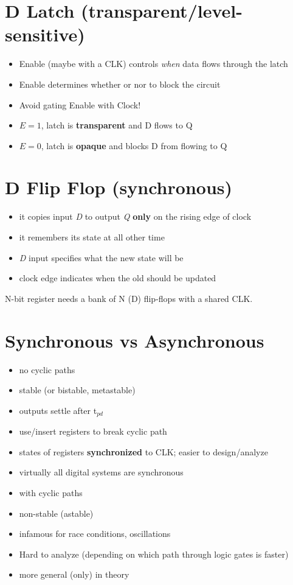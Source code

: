 \documentclass[8pt,a4paper,landscape]{extarticle}
\begin{document}
\begin{multicols*}{3}
\section*{D Latch (transparent/level-sensitive)}
\begin{itemize}
\item Enable (maybe with a CLK) controls \emph{when} data flows through the latch
\item Enable determines whether or nor to block the circuit
\item Avoid gating Enable with Clock!
\item $E = 1$, latch is \textbf{transparent} and D flows to Q
\item $E = 0$, latch is \textbf{opaque} and blocks D from flowing to Q
\end{itemize}
\section*{D Flip Flop (synchronous)}
\begin{itemize}
\item it copies input \emph{D} to output \emph{Q} \textbf{only} on the rising edge of clock
\item it remembers its state at all other time
\item \emph{D} input specifies what the new state will be
\item clock edge indicates when the old should be updated
\end{itemize}
N-bit register needs a bank of N (D) flip-flops with a shared CLK.



\section*{Synchronous vs Asynchronous}
\begin{minipage}[h]{0.5\linewidth}
\begin{itemize}
\item no cyclic paths
\item stable (or bistable, metastable)
\item outputs settle after t$_{pd}$
\item use/insert registers to break cyclic path
\item states of registers \textbf{synchronized} to CLK; easier to design/analyze
\item virtually all digital systems are synchronous
\end{itemize}
\end{minipage}
\begin{minipage}[h]{0.5\linewidth}
\begin{itemize}
\item with cyclic paths
\item non-stable (astable)
\item infamous for race conditions, oscillations
\item Hard to analyze (depending on which path through logic gates is faster)
\item more general (only) in theory
\end{itemize}
\end{minipage}


\end{multicols*}
\end{document}
